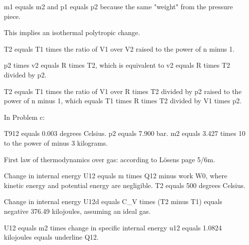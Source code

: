 m1 equals m2 and p1 equals p2 because the same "weight" from the pressure piece.

This implies an isothermal polytropic change.

T2 equals T1 times the ratio of V1 over V2 raised to the power of n minus 1.

p2 times v2 equals R times T2, which is equivalent to v2 equals R times T2 divided by p2.

T2 equals T1 times the ratio of V1 over R times T2 divided by p2 raised to the power of n minus 1, which equals T1 times R times T2 divided by V1 times p2.

In Problem c:

T912 equals 0.003 degrees Celsius.
p2 equals 7.900 bar.
m2 equals 3.427 times 10 to the power of minus 3 kilograms.

First law of thermodynamics over gas: according to Lösens page 5/6m.

Change in internal energy U12 equals m times Q12 minus work W0, where kinetic energy and potential energy are negligible.
T2 equals 500 degrees Celsius.

Change in internal energy U12d equals C_V times (T2 minus T1) equals negative 376.49 kilojoules, assuming an ideal gas.

U12 equals m2 times change in specific internal energy u12 equals 1.0824 kilojoules equals underline Q12.